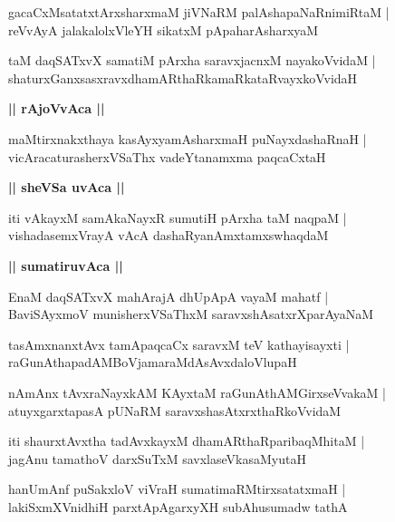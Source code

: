 \documentclass[twoside,12pt,openright]{book}
\newcounter{shloka}[chapter]
\def\uvaca#1{\centerline{{\large\textbf{#1}}}}
\begin{document}
\begin{shloka}%
gacaCxMsatatxtArxsharxmaM jiVNaRM  palAshapaNaRnimiRtaM |\\
reVvAyA jalakalolxVleYH sikatxM pApaharAsharxyaM 
\end{shloka}

\begin{shloka}%
taM daqSATxvX samatiM pArxha saravxjacnxM nayakoVvidaM |\\
shaturxGanxsasxravxdhamARthaRkamaRkataRvayxkoVvidaH
\end{shloka}

\uvaca{|| rAjoVvAca ||}

\begin{shloka}%
maMtirxnakxthaya kasAyxyamAsharxmaH puNayxdashaRnaH |\\
vicAracaturasherxVSaThx vadeYtanamxma paqcaCxtaH 
\end{shloka}

\uvaca{|| sheVSa uvAca ||}
 
\begin{shloka}%
iti vAkayxM samAkaNayxR sumutiH pArxha taM naqpaM |\\
vishadasemxVrayA vAcA dashaRyanAmxtamxswhaqdaM
\end{shloka}

\uvaca{|| sumatiruvAca ||}

\begin{shloka}%
EnaM daqSATxvX mahArajA dhUpApA vayaM mahatf |\\
BaviSAyxmoV munisherxVSaThxM saravxshAsatxrXparAyaNaM 
\end{shloka}

\begin{shloka}%
tasAmxnanxtAvx tamApaqcaCx saravxM teV kathayisayxti |\\
raGunAthapadAMBoVjamaraMdAsAvxdaloVlupaH 
\end{shloka}

\begin{shloka}%
nAmAnx tAvxraNayxkAM KAyxtaM raGunAthAMGirxseVvakaM |\\
atuyxgarxtapasA pUNaRM saravxshasAtxrxthaRkoVvidaM  
\end{shloka}

\begin{shloka}%
iti shaurxtAvxtha tadAvxkayxM dhamARthaRparibaqMhitaM |\\
jagAnu tamathoV darxSuTxM savxlaseVkasaMyutaH
\end{shloka}

\begin{shloka}%
hanUmAnf puSakxloV viVraH sumatimaRMtirxsatatxmaH |\\
lakiSxmXVnidhiH parxtApAgarxyXH subAhusumadw tathA 
\end{shloka}
\end{document}

